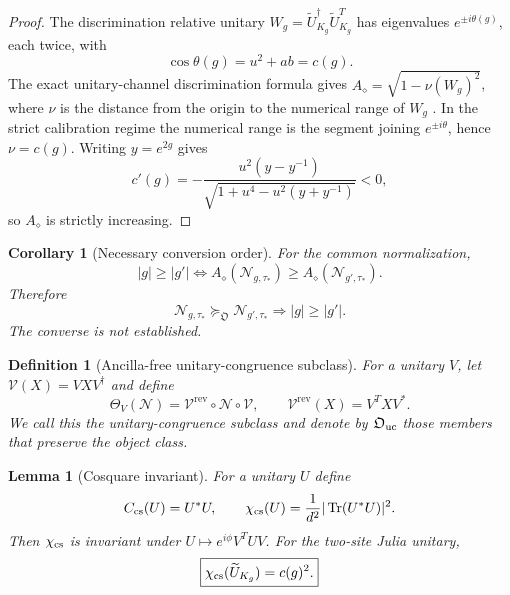\documentclass[reprint,amsmath,amssymb,aps,nofootinbib]{revtex4-2}
\newtheorem{definition}{Definition}
\newtheorem{lemma}{Lemma}
\newtheorem{corollary}{Corollary}
\newcommand{\Tr}{\operatorname{Tr}}
\newcommand{\FreeOps}{\mathfrak O}
\newcommand{\rev}{\mathrm{rev}}
\begin{document}
\begin{proof}
The discrimination relative unitary
$W_g=\widetilde U_{K_g}^\dagger\widetilde U_{K_g}^T$ has eigenvalues
$e^{\pm i\theta(g)}$, each twice, with
\begin{equation}
\cos\theta(g)=u^2+ab=c(g).
\end{equation}
The exact unitary-channel discrimination formula gives
$A_\diamond=\sqrt{1-\nu(W_g)^2}$, where $\nu$ is the distance from the origin to the numerical
range of $W_g$ \cite{Acin2001}. In the strict calibration regime the numerical range is the
segment joining $e^{\pm i\theta}$, hence $\nu=c(g)$. Writing $y=e^{2g}$ gives
\begin{equation}
c'(g)=
-\frac{u^2(y-y^{-1})}{\sqrt{1+u^4-u^2(y+y^{-1})}}<0,
\end{equation}
so $A_\diamond$ is strictly increasing.
\end{proof}

\begin{corollary}[Necessary conversion order]
For the common normalization,
\begin{equation}
\boxed{
|g|\ge|g'|
\iff
A_\diamond(\mathcal N_{g,\tau_*})
\ge
A_\diamond(\mathcal N_{g',\tau_*}).}
\end{equation}
Therefore
\begin{equation}
\boxed{
\mathcal N_{g,\tau_*}\succeq_{\FreeOps}\mathcal N_{g',\tau_*}
\Longrightarrow |g|\ge|g'|.
}
\end{equation}
The converse is not established.
\end{corollary}

\begin{definition}[Ancilla-free unitary-congruence subclass]
For a unitary $V$, let $\mathcal V(X)=VXV^\dagger$ and define
\begin{equation}
\Theta_V(\mathcal N)=\mathcal V^{\rev}\circ\mathcal N\circ\mathcal V,
\qquad
\mathcal V^{\rev}(X)=V^TXV^*.
\end{equation}
We call this the unitary-congruence subclass and denote by $\FreeOps_{\rm uc}$ those members that
preserve the object class.
\end{definition}

\begin{lemma}[Cosquare invariant]
For a unitary $U$ define
\begin{equation}
C_{\rm cs}(U)=U^*U,
\qquad
\chi_{\rm cs}(U)=\frac1{d^2}|\Tr(U^*U)|^2.
\end{equation}
Then $\chi_{\rm cs}$ is invariant under
$U\mapsto e^{i\phi}V^TUV$. For the two-site Julia unitary,
\begin{equation}
\boxed{\chi_{\rm cs}(\widetilde U_{K_g})=c(g)^2.}
\end{equation}
\end{lemma}
\end{document}

